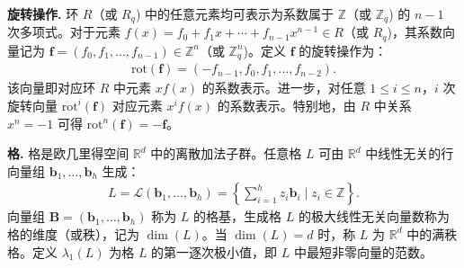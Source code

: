 \documentclass[12pt,a4paper]{article}
\numberwithin{equation}{section}
\begin{document}

\textbf{旋转操作.} 
环 $R$（或 $R_q$) 中的任意元素均可表示为系数属于 $\mathbb{Z}$（或 $\mathbb{Z}_q$) 的 $n-1$ 次多项式。对于元素 $f(x) = f_0 + f_1x + \cdots + f_{n-1}x^{n-1} \in R$（或 $R_q$)，其系数向量记为 $\mathbf{f} = (f_0, f_1, \ldots , f_{n-1}) \in \mathbb{Z}^n$（或 $\mathbb{Z}^n_q$)。定义 $\mathbf{f}$ 的旋转操作为：
\begin{align}
    \mathrm{rot}(\mathbf{f}) = (-f_{n-1}, f_0, f_1, \ldots , f_{n-2}).
\end{align}
该向量即对应环 $R$ 中元素 $xf(x)$ 的系数表示。进一步，对任意 $1 \leq i \leq n$，$i$ 次旋转向量 $\mathrm{rot}^i(\mathbf{f})$ 对应元素 $x^if(x)$ 的系数表示。特别地，由 $R$ 中关系 $x^n = -1$ 可得 $\mathrm{rot}^n(\mathbf{f}) = -\mathbf{f}$。

\textbf{格.}
格是欧几里得空间 $\mathbb{R}^d$ 中的离散加法子群。任意格 $L$ 可由 $\mathbb{R}^d$ 中线性无关的行向量组 $\mathbf{b}_1,\ldots, \mathbf{b}_h$ 生成：
\begin{align}
    L = \mathcal{L}(\mathbf{b}_1,\ldots, \mathbf{b}_h) = \left\{ \sum_{i=1}^h z_i \mathbf{b}_i \mid z_i \in \mathbb{Z} \right\}.
\end{align}
向量组 $\mathbf{B}=(\mathbf{b}_1,\ldots, \mathbf{b}_h)$ 称为 $L$ 的格基，生成格 $L$ 的极大线性无关向量数称为格的维度（或秩），记为 $\dim(L)$。当 $\dim(L) = d$ 时，称 $L$ 为 $\mathbb{R}^d$ 中的满秩格。定义 $\lambda_1(L)$ 为格 $L$ 的第一逐次极小值，即 $L$ 中最短非零向量的范数。
\end{document}
